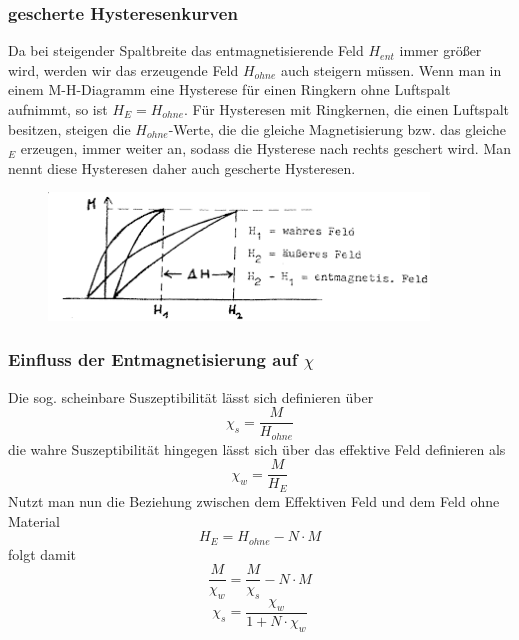         \subsubsection*{gescherte Hysteresenkurven}
            Da bei steigender Spaltbreite das entmagnetisierende Feld $H_{ent}$ immer größer wird, werden wir das erzeugende Feld $H_{ohne}$
            auch steigern müssen. Wenn man in einem M-H-Diagramm eine Hysterese für einen Ringkern
            ohne Luftspalt aufnimmt, so ist $H_{E}=H_{ohne}$. Für Hysteresen mit Ringkernen,
            die einen Luftspalt besitzen, steigen die $H_{ohne}$-Werte, die die gleiche Magnetisierung
            bzw. das gleiche $_{E}$ erzeugen, immer weiter an, sodass die Hysterese nach rechts
            geschert wird. Man nennt diese Hysteresen daher auch gescherte Hysteresen.
            \begin{figure}
                \centering
                \includegraphics[width=0.9\textwidth]{Images/geschert.png}
            \end{figure}

        \subsubsection*{Einfluss der Entmagnetisierung auf $\chi$}
            Die sog. scheinbare Suszeptibilität lässt sich definieren über
            \begin{equation}
                \chi_s = \frac{M}{H_{ohne}}
            \end{equation}
            die wahre Suszeptibilität hingegen lässt sich über das effektive Feld definieren als
            \begin{equation}
                \chi_w = \frac{M}{H_{E}}
            \end{equation}
            Nutzt man nun die Beziehung zwischen dem Effektiven Feld und dem Feld ohne Material
            \begin{equation}
                H_E = H_{ohne} - N\cdot M
            \end{equation}
            folgt damit
            \begin{equation}
                \frac{M}{\chi_w} = \frac{M}{\chi_s} - N \cdot M
            \end{equation}
            \begin{equation}
                \chi_s = \frac{\chi_w}{1+N\cdot \chi_w}
            \end{equation}

